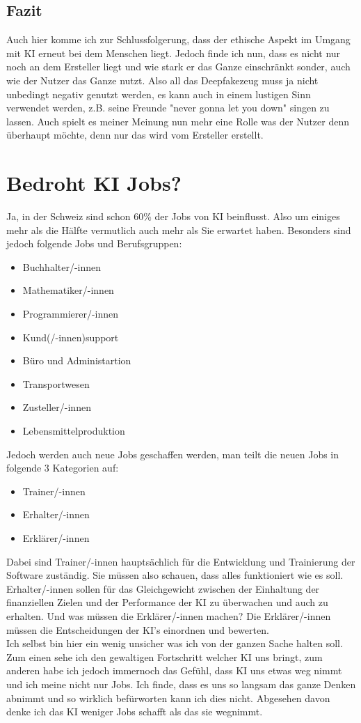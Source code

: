 \subsection{Fazit}
Auch hier komme ich zur Schlussfolgerung, dass der ethische Aspekt im Umgang mit KI erneut bei dem Menschen liegt. Jedoch finde ich nun, dass es nicht nur noch an dem Ersteller liegt und wie stark er das Ganze einschränkt sonder, auch wie der Nutzer das Ganze nutzt.
Also all das Deepfakezeug muss ja nicht unbedingt negativ genutzt werden, es kann auch in einem lustigen Sinn verwendet werden, z.B. seine Freunde "never gonna let you down" singen zu lassen.
Auch spielt es meiner Meinung nun mehr eine Rolle was der Nutzer denn überhaupt möchte, denn nur das wird vom Ersteller erstellt.
\newpage
\section{Bedroht KI Jobs?}
Ja, in der Schweiz sind schon 60\% der Jobs von KI beinflusst. Also um einiges mehr als die Hälfte vermutlich auch mehr als Sie erwartet haben. Besonders sind jedoch folgende Jobs und Berufsgruppen:
\begin{itemize}
    \item Buchhalter/-innen
    \item Mathematiker/-innen
    \item Programmierer/-innen
    \item Kund(/-innen)support
    \item Büro und Administartion
    \item Transportwesen
    \item Zusteller/-innen
    \item Lebensmittelproduktion
\end{itemize}
Jedoch werden auch neue Jobs geschaffen werden, man teilt die neuen Jobs in folgende 3 Kategorien auf:
\begin{itemize}
    \item Trainer/-innen
    \item Erhalter/-innen
    \item Erklärer/-innen
\end{itemize}
Dabei sind Trainer/-innen hauptsächlich für die Entwicklung und Trainierung der Software zuständig. Sie müssen also schauen, dass alles funktioniert wie es soll.
Erhalter/-innen sollen für das Gleichgewicht zwischen der Einhaltung der finanziellen Zielen und der Performance der KI zu überwachen und auch zu erhalten.
Und was müssen die Erklärer/-innen machen? Die Erklärer/-innen müssen die Entscheidungen der KI's einordnen und bewerten.\citep{bedrohte-jobs-kununu}
\\
Ich selbst bin hier ein wenig unsicher was ich von der ganzen Sache halten soll. Zum einen sehe ich den  gewaltigen Fortschritt welcher KI uns bringt, zum anderen habe ich jedoch immernoch das Gefühl,
dass KI uns etwas weg nimmt und ich meine nicht nur Jobs. Ich finde, dass es uns so langsam das ganze Denken abnimmt und so wirklich befürworten kann ich dies nicht. Abgesehen davon denke ich das KI weniger Jobs schafft als das sie wegnimmt.
\\
\\
